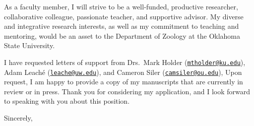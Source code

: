\documentclass[letterpaper, 10pt]{letter}
\begin{document}
\begin{letter}
As a faculty member, I will strive to be a well-funded, productive
researcher, collaborative colleague, passionate teacher, and supportive
advisor.
My diverse and integrative research interests, as well as my commitment to
teaching and mentoring, would be an asset to the Department of Zoology at
the Oklahoma State University.

I have requested letters of support from Drs.\
Mark Holder
(\href{mailto:mtholder@ku.edu}{\tt mtholder@ku.edu}),
Adam Leach\'{e}
(\href{mailto:leache@uw.edu}{\tt leache@uw.edu}),
and
Cameron Siler
(\href{mailto:camsiler@ou.edu}{\tt camsiler@ou.edu}),
Upon request, I am happy to provide a copy of my manuscripts that are
currently in review or in press.
Thank you for considering my application, and I look forward to speaking
with you about this position.

\addtolength{\medskipamount}{-5pt}
\closing{Sincerely,}
\end{letter}
\end{document}
